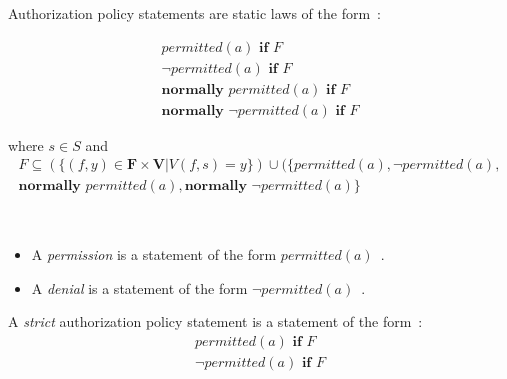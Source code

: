 \begin{definition}
    \label{def:authorization_statements}
    Authorization policy statements are static laws of the form~\citep{gelfond_authorization_2008}:

    \begin{gather}
        permitted\left(a\right) \textbf{ if } F \\
        \neg permitted\left(a\right) \textbf{ if } F \\
        \textbf{normally } permitted(a) \textbf{ if } F \\
        \textbf{normally } \neg permitted(a) \textbf{ if } F
    \end{gather}

    \noindent
    where
    $s \in S$
    and\footnotemark
    \begin{multline}
        F\subseteq\left(\{(f, y) \in \boldsymbol{F} \times \boldsymbol{V} | V(f,s)=y\}\right) \cup (\{permitted(a),
        \neg permitted(a), \\
        \textbf{normally } permitted(a),
        \textbf{normally } \neg permitted(a)\}
    \end{multline}

\end{definition}

\begin{definition}
    \label{def:permission}
    \label{def:denial}
    ~

    \begin{itemize}
        \item A \textit{permission} is a statement of the form $permitted(a)$~\citep{gelfond_authorization_2008}.
        \item A \textit{denial} is a statement of the form $\neg permitted(a)$~\citep{gelfond_authorization_2008}.
    \end{itemize}
\end{definition}

\begin{definition}
    \label{def:strict_authorization_statements}
    A \textit{strict} authorization policy statement is a statement of the form~\citep{gelfond_authorization_2008}:
    \begin{gather*}
        permitted\left(a\right) \textbf{ if } F \\
        \neg permitted\left(a\right) \textbf{ if } F
    \end{gather*}
\end{definition}

